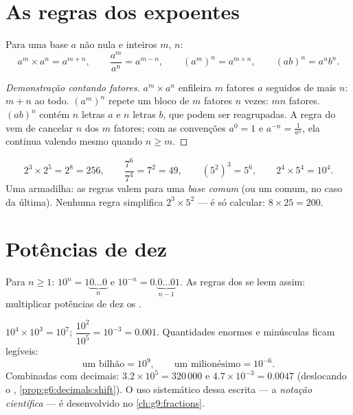 \section{As regras dos expoentes}

\begin{theorem}\label{thm:g8:powers:rules}
Para uma base $a$ não nula e  inteiros $m$, $n$:
\[
a^m \times a^n = a^{m+n},
\qquad
\frac{a^m}{a^n} = a^{m-n},
\qquad
\left(a^m\right)^n = a^{m \times n},
\qquad
(ab)^n = a^n b^n .
\]
\end{theorem}

\begin{proof}[Demonstração contando fatores]
$a^m \times a^n$ enfileira $m$ fatores $a$ seguidos de mais $n$:
$m + n$ ao todo. $\left(a^m\right)^n$ repete um bloco de $m$ fatores
$n$ vezes: $mn$ fatores. $(ab)^n$ contém $n$ letras $a$ e $n$ letras
$b$, que podem ser reagrupadas. A regra do  vem de cancelar
$n$ dos $m$ fatores; com as convenções $a^0 = 1$ e
$a^{-n} = \frac{1}{a^n}$, ela continua valendo mesmo quando
$n \geq m$.
\end{proof}

\begin{example}\label{ex:g8:powers:rules}
\[
2^3 \times 2^5 = 2^8 = 256,
\qquad
\frac{7^6}{7^4} = 7^2 = 49,
\qquad
\left(5^2\right)^3 = 5^6,
\qquad
2^4 \times 5^4 = 10^4 .
\]
Uma armadilha: as regras valem para uma \emph{base comum} (ou um
 comum, no caso da última). Nenhuma regra simplifica
$2^3 \times 5^2$ --- é só calcular: $8 \times 25 = 200$.
\end{example}

\section{Potências de dez}

\begin{proposition}\label{prop:g8:powers:ten}
Para $n \geq 1$: $10^n = 1\underbrace{0\dots0}_{n}$ e
$10^{-n} = 0.\underbrace{0\dots0}_{n-1}1$. As regras dos  se
leem assim: multiplicar potências de dez  os .
\end{proposition}

\begin{example}\label{ex:g8:powers:ten}
$10^4 \times 10^3 = 10^7$; \quad
$\dfrac{10^2}{10^5} = 10^{-3} = 0.001$. Quantidades enormes e
minúsculas ficam legíveis:
\[
\text{um bilhão} = 10^9,
\qquad
\text{um milionésimo} = 10^{-6}.
\]
Combinadas com decimais: $3.2 \times 10^5 = 320\,000$ e
$4.7 \times 10^{-3} = 0.0047$ (deslocando o ,
\cref{prop:g6:decimals:shift}). O uso sistemático dessa escrita --- a
\emph{notação científica} --- é desenvolvido no
\cref{ch:g9:fractions}.
\end{example}

